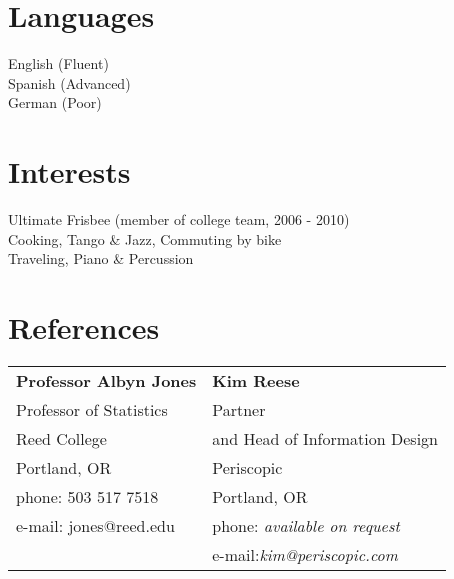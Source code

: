 \documentclass[margin,line]{resume}
\begin{document}
\begin{resume}
    \section{\mysidestyle Languages}
English (Fluent) \\
Spanish (Advanced)\\
German (Poor)   %

\newpage
    \section{\mysidestyle Interests} 

Ultimate Frisbee (member of college team, 2006 - 2010) \\
Cooking, Tango \& Jazz, Commuting by bike \\
Traveling, Piano \& Percussion 




\section{\mysidestyle References} 

\begin{tabular}{@{}p{6cm}p{6cm}}
\textbf{Professor Albyn Jones}       &  \textbf{Kim Reese}                   \\
Professor of Statistics                              &  Partner                        \\
Reed College                     &  and Head of Information Design                  \\
Portland, OR           & Periscopic        \\
phone: 503 517 7518    &  Portland, OR    \\
e-mail: jones@reed.edu   &  phone: \textsl{available on request}     \\
 & e-mail:\textsl{kim@periscopic.com}
\end{tabular}


\end{resume}
\end{document}
